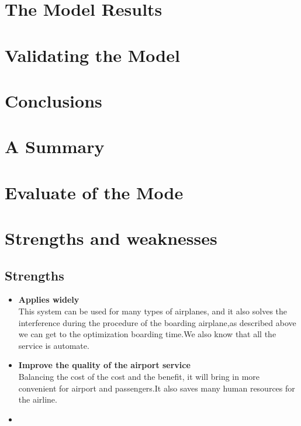 \documentclass{mcmthesis}
\begin{document}
\section{The Model Results}
\lipsum[6]

\section{Validating the Model}
\lipsum[9]

\section{Conclusions}
\lipsum[6]

\section{A Summary}
\lipsum[6]

\section{Evaluate of the Mode}

\section{Strengths and weaknesses}
\lipsum[12]

\subsection{Strengths}
\begin{itemize}
\item \textbf{Applies widely}\\
This  system can be used for many types of airplanes, and it also
solves the interference during  the procedure of the boarding
airplane,as described above we can get to the  optimization
boarding time.We also know that all the service is automate.
\item \textbf{Improve the quality of the airport service}\\
Balancing the cost of the cost and the benefit, it will bring in
more convenient  for airport and passengers.It also saves many
human resources for the airline. \item \textbf{}
\end{itemize}


\end{document}
